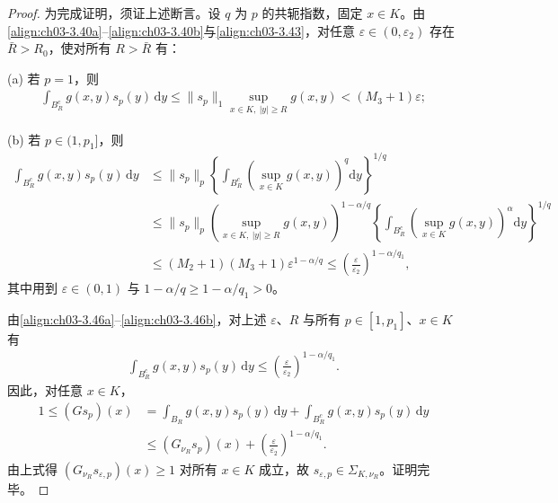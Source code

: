\documentclass[../../main.tex]{subfiles}%
\begin{document}
\begin{proof}
为完成证明，须证上述断言。设 $q$ 为 $p$ 的共轭指数，固定 $x\in K$。由\eqref{align:ch03-3.40a}--\eqref{align:ch03-3.40b}与\eqref{align:ch03-3.43}，对任意 $\varepsilon\in(0,\varepsilon_2)$ 存在 $\bar R>R_0$，使对所有 $R>\bar R$ 有：

(a) 若 $p=1$，则
\begin{align}
\int_{B_R^c}g(x,y)s_p(y)\,\mathrm{d}y\leqslant\|s_p\|_1\sup_{x\in K,\ |y|\geqslant R}g(x,y)<(M_3+1)\varepsilon;\label{align:ch03-3.46a}
\end{align}

(b) 若 $p\in(1,p_1]$，则
\begin{align}
\int_{B_R^c}g(x,y)s_p(y)\,\mathrm{d}y
&\leqslant\|s_p\|_p\left\{\int_{B_R^c}\left(\sup_{x\in K}g(x,y)\right)^q\mathrm{d}y\right\}^{1/q}\nonumber\\
&\leqslant\|s_p\|_p\left(\sup_{x\in K,\ |y|\geqslant R}g(x,y)\right)^{1-\alpha/q}\left\{\int_{B_R^c}\left(\sup_{x\in K}g(x,y)\right)^\alpha\mathrm{d}y\right\}^{1/q}\nonumber\\
&\leqslant(M_2+1)(M_3+1)\varepsilon^{1-\alpha/q}\leqslant\left(\frac{\varepsilon}{\varepsilon_2}\right)^{1-\alpha/q_1},\label{align:ch03-3.46b}
\end{align}
其中用到 $\varepsilon\in(0,1)$ 与 $1-\alpha/q\geqslant1-\alpha/q_1>0$。

由\eqref{align:ch03-3.46a}--\eqref{align:ch03-3.46b}，对上述 $\varepsilon$、$R$ 与所有 $p\in[1,p_1]$、$x\in K$ 有
\begin{align*}
\int_{B_R^c}g(x,y)s_p(y)\,\mathrm{d}y\leqslant\left(\frac{\varepsilon}{\varepsilon_2}\right)^{1-\alpha/q_1}.
\end{align*}
因此，对任意 $x\in K$，
\begin{align*}
1\leqslant(Gs_p)(x)&=\int_{B_R}g(x,y)s_p(y)\,\mathrm{d}y+\int_{B_R^c}g(x,y)s_p(y)\,\mathrm{d}y\\
&\leqslant(G_{\nu_R}s_p)(x)+\left(\frac{\varepsilon}{\varepsilon_2}\right)^{1-\alpha/q_1}.
\end{align*}
由上式得 $(G_{\nu_R}s_{\varepsilon,p})(x)\geqslant1$ 对所有 $x\in K$ 成立，故 $s_{\varepsilon,p}\in\Sigma_{K,\nu_R}$。证明完毕。
\end{proof}
\end{document}
